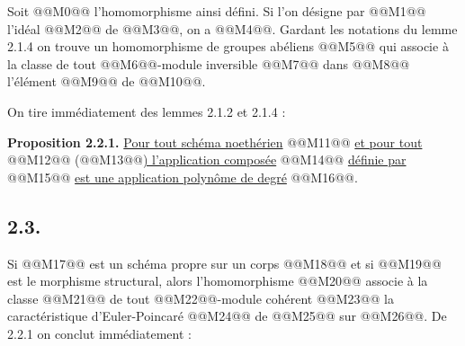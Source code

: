 
Soit @@M0@@ l'homomorphisme ainsi défini. Si l'on désigne par @@M1@@ l'idéal @@M2@@ de @@M3@@, on a @@M4@@. Gardant les notations du lemme 2.1.4 on trouve un homomorphisme de groupes abéliens
@@M5@@
qui associe à la classe de tout @@M6@@-module inversible @@M7@@ dans @@M8@@ l'élément @@M9@@ de @@M10@@.

On tire immédiatement des lemmes 2.1.2 et 2.1.4 :

\textbf{Proposition 2.2.1.} \uline{Pour tout schéma noethérien} @@M11@@ \uline{et pour tout} @@M12@@ (@@M13@@\uline{) l'application composée}
@@M14@@
\uline{définie par}
@@M15@@
\uline{est une application polynôme de degré} @@M16@@.

\subsection*{2.3.}
Si @@M17@@ est un schéma propre sur un corps @@M18@@ et si @@M19@@ est le morphisme structural, alors l'homomorphisme
@@M20@@
associe à la classe @@M21@@ de tout @@M22@@-module cohérent @@M23@@ la caractéristique d'Euler-Poincaré @@M24@@ de @@M25@@ sur @@M26@@. De 2.2.1 on conclut immédiatement :

